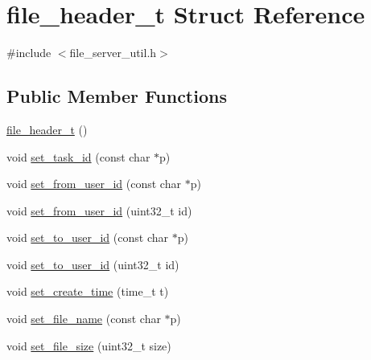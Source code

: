 \hypertarget{structfile__header__t}{}\section{file\+\_\+header\+\_\+t Struct Reference}
\label{structfile__header__t}


{\ttfamily \#include $<$file\+\_\+server\+\_\+util.\+h$>$}

\subsection*{Public Member Functions}
\begin{DoxyCompactItemize}
\item 
\hyperlink{structfile__header__t_ad712c9d602ec8eee0a4225f0cb68aae7}{file\+\_\+header\+\_\+t} ()
\item 
void \hyperlink{structfile__header__t_a7905ffe4a9e8f31e3a4cf6cb70496f38}{set\+\_\+task\+\_\+id} (const char $\ast$p)
\item 
void \hyperlink{structfile__header__t_ade0b7df01bd1a108902af50387604f4a}{set\+\_\+from\+\_\+user\+\_\+id} (const char $\ast$p)
\item 
void \hyperlink{structfile__header__t_a29ddcca889c710a075ea632160dcb93f}{set\+\_\+from\+\_\+user\+\_\+id} (uint32\+\_\+t id)
\item 
void \hyperlink{structfile__header__t_a659fdc0149e530fba7bbf5bdde17186d}{set\+\_\+to\+\_\+user\+\_\+id} (const char $\ast$p)
\item 
void \hyperlink{structfile__header__t_a6c8aaa257ec89c28d76d108fb626b504}{set\+\_\+to\+\_\+user\+\_\+id} (uint32\+\_\+t id)
\item 
void \hyperlink{structfile__header__t_aaefce9a77c6fdd1cf870d3f97aaa223e}{set\+\_\+create\+\_\+time} (time\+\_\+t t)
\item 
void \hyperlink{structfile__header__t_ad28709022902ff09f17743abfd44e55a}{set\+\_\+file\+\_\+name} (const char $\ast$p)
\item 
void \hyperlink{structfile__header__t_a05f7cdabfa617cb4edd5bdb9d95b4c00}{set\+\_\+file\+\_\+size} (uint32\+\_\+t size)
\end{DoxyCompactItemize}

